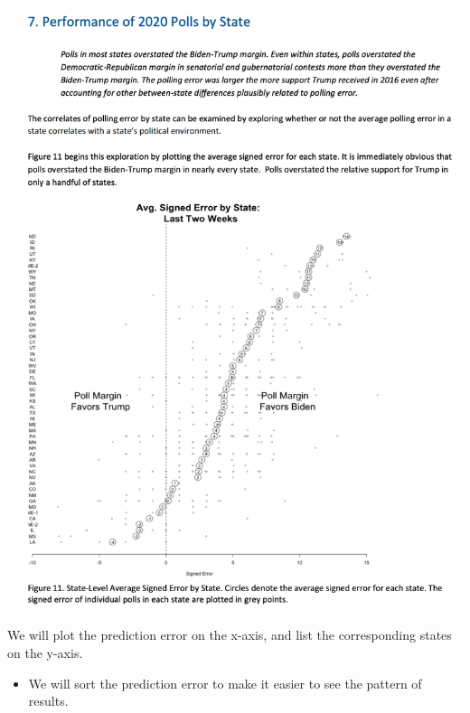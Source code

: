 \documentclass[
  letterpaper,
  DIV=11,
  numbers=noendperiod]{scrreprt}
\providecommand{\tightlist}{%
  \setlength{\itemsep}{0pt}\setlength{\parskip}{0pt}}\usepackage{longtable,booktabs,array}
\begin{document}
\includegraphics{images/aapor20.png}

We will plot the prediction error on the x-axis, and list the
corresponding states on the y-axis.

\begin{itemize}
\tightlist
\item
  We will sort the prediction error to make it easier to see the pattern
  of results.
\end{itemize}
\end{document}
